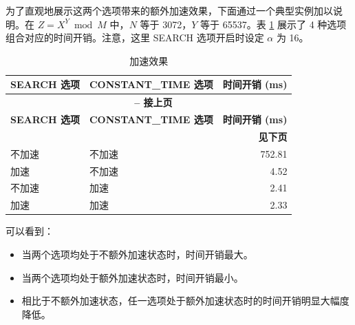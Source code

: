\documentclass[main\_\_CN.tex]{subfiles}
\begin{document}
为了直观地展示这两个选项带来的额外加速效果，下面通过一个典型实例加以说明。在 \begin{math}Z = X^{Y} \bmod M\end{math} 中，\begin{math}N\end{math} 等于 3072，\begin{math}Y\end{math} 等于 65537。表 \ref{tab:accelerationeffect} 展示了 4 种选项组合对应的时间开销。注意，这里 SEARCH 选项开启时设定 \begin{math} \alpha \end{math} 为 16。

\begin{longtable}{ | l | l | r | }
    \caption{加速效果}\label{tab:accelerationeffect}
    \\\hline
    \rowcolor{lightgray}
    \textbf{SEARCH 选项} & \textbf{CONSTANT\_TIME 选项} & \textbf{时间开销 (ms)}  \\ \hline
    \endfirsthead
    
    \multicolumn{3}{c}{\bfseries \tablename\ \thetable{} -- 接上页}\\\hline
    
    \rowcolor{lightgray}
    \textbf{SEARCH 选项} & \textbf{CONSTANT\_TIME 选项} & \textbf{时间开销 (ms)}  \\ \hline
    \endhead
    
    \multicolumn{3}{r}{\textbf{见下页}} \\
    \endfoot
    \endlastfoot
    \hline
    
     不加速 & 不加速 & 752.81   \\ \hline    
     加速 & 不加速 & 4.52     \\ \hline
     不加速 & 加速 & 2.41     \\ \hline
     加速 & 加速 & 2.33     \\ \hline
\end{longtable}

可以看到：
\begin{itemize}
    \item 当两个选项均处于不额外加速状态时，时间开销最大。
    \item 当两个选项均处于额外加速状态时，时间开销最小。
    \item 相比于不额外加速状态，任一选项处于额外加速状态时的时间开销明显大幅度降低。
\end{itemize}

\clearpage
\end{document}
